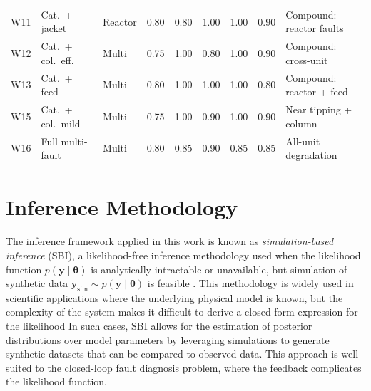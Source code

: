 \documentclass[aps,pre,twocolumn,superscriptaddress]{revtex4-2}
\begin{document}
\begin{table}[htbp]
\begin{tabular}{cllcccccl}
W11 & Cat.~+ jacket       & Reactor  & 0.80 & 0.80 & 1.00 & 1.00 & 0.90 & Compound: reactor faults \\
W12 & Cat.~+ col.~eff.    & Multi    & 0.75 & 1.00 & 0.80 & 1.00 & 0.90 & Compound: cross-unit \\
W13 & Cat.~+ feed         & Multi    & 0.80 & 1.00 & 1.00 & 1.00 & 0.80 & Compound: reactor + feed \\
W15 & Cat.~+ col.~mild    & Multi    & 0.75 & 1.00 & 0.90 & 1.00 & 0.90 & Near tipping + column \\
W16 & Full multi-fault    & Multi    & 0.80 & 0.85 & 0.90 & 0.85 & 0.85 & All-unit degradation \\
\bottomrule
\end{tabular}
\end{table}

\section{Inference Methodology}\label{sec:methodology}

The inference framework applied in this work is known as \emph{simulation-based inference} (SBI), a likelihood-free inference methodology used when the likelihood function $p(\mathbf{y} \mid \boldsymbol{\theta})$ is analytically intractable or unavailable, but simulation of synthetic data $\mathbf{y}_\text{sim} \sim p(\mathbf{y} \mid \boldsymbol{\theta})$ is feasible \citep{Cranmer2020}. This methodology is widely used in scientific applications where the underlying physical model is known, but the complexity of the system makes it difficult to derive a closed-form expression for the likelihood
In such cases, SBI allows for the estimation of posterior distributions over model parameters by leveraging simulations to generate synthetic datasets that can be compared to observed data. This approach is well-suited to the closed-loop fault diagnosis problem, where the feedback complicates the likelihood function.
\end{document}
